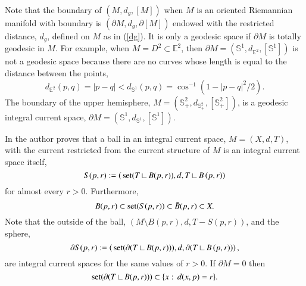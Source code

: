 \documentclass[12pt]{amsart}
\begin{document}
Note that the boundary of $(M, d_g, [M])$ when $M$ is an oriented Riemannian manifold with boundary is
$(\partial M, d_g, \partial[M])$ endowed with the restricted distance, $d_g$,
defined on $M$ as in (\ref{dg}).  It is only a geodesic space if $\partial M$
is totally geodesic in $M$.   For example, when $M=D^2\subset {\mathbb{E}}^2$, then
$\partial M=(\mathbb{S}^1, d_{{\mathbb{E}}^2}, [\mathbb{S}^1])$ is not a geodesic space because
there are no curves whose length is equal to the distance between the 
points, 
\begin{equation}
d_{{\mathbb{E}}^2}(p,q)=|p-q|< d_{\mathbb{S}^1}(p,q)=\cos^{-1}( 1-|p-q|^2/2).   
\end{equation}
The boundary of the upper hemisphere, 
$M= \left(\mathbb{S}^2_+, d_{\mathbb{S}^2_+}, [\mathbb{S}^2_+]\right)$,
is a geodesic integral current space, 
$\partial M=\left(\mathbb{S}^1, d_{\mathbb{S}^1}, [\mathbb{S}^1]\right)$.

In \cite{Sormani-AA} the author proves that
a ball in an integral current space, $M=\left(X,d,T\right)$,
with the current restricted from the current structure of $M$ is an integral current space itself, 
\begin{equation}\label{Spr}
S(p,r):=\left(\,{{\rm{set}}}(T{\:\mbox{\rule{0.1ex}{1.2ex}\rule{1.1ex}{0.1ex}}\:} B(p,r)),d,T{\:\mbox{\rule{0.1ex}{1.2ex}\rule{1.1ex}{0.1ex}}\:} B\left(p,r\right)\right)
\end{equation}
for almost every $r > 0$.   Furthermore,
\begin{equation}\label{ball-in-ball}
B(p,r) \subset {{\rm{set}}}(S(p,r))\subset \bar{B}(p,r)\subset X.
\end{equation}
Note that
the outside of the ball, $(M\setminus B(p,r), d, T-S(p,r))$, 
and the sphere, 
\begin{equation}
\partial S(p,r):=\left(\,{{\rm{set}}}(\partial(T{\:\mbox{\rule{0.1ex}{1.2ex}\rule{1.1ex}{0.1ex}}\:} B(p,r))),d,\partial(T{\:\mbox{\rule{0.1ex}{1.2ex}\rule{1.1ex}{0.1ex}}\:} B\left(p,r\right))\right),
\end{equation}
are integral current spaces 
for the same values of $r>0$.  If $\partial M=0$ then
\begin{equation}
{{\rm{set}}}(\partial(T{\:\mbox{\rule{0.1ex}{1.2ex}\rule{1.1ex}{0.1ex}}\:} B(p,r))) \subset \{x: \, d(x,p)=r\}.
\end{equation}
\end{document}
